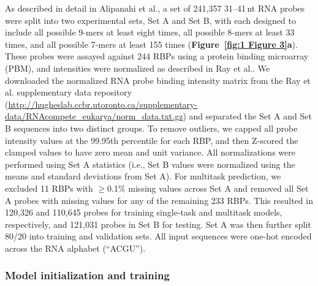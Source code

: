 As described in detail in Alipanahi et al.\cite{Alipanahi2015-ef}, a set of 241{,}357 31--41\,nt RNA probes were split into two experimental sets, Set A and Set B, with each designed to include all possible 9-mers at least eight times, all possible 8-mers at least 33 times, and all possible 7-mers at least 155 times (\textbf{Figure~\ref{fig:1 Figure 3}\textbf{a}}). These probes were assayed against 244 RBPs using a protein binding microarray (PBM)\cite{Berger2009-la}, and intensities were normalized as described in Ray et al.\cite{Ray2013-yd}. We downloaded the normalized RNA probe binding intensity matrix from the Ray et al. supplementary data repository (\url{http://hugheslab.ccbr.utoronto.ca/supplementary-data/RNAcompete_eukarya/norm_data.txt.gz}) and separated the Set A and Set B sequences into two distinct groups. To remove outliers, we capped all probe intensity values at the 99.95th percentile for each RBP, and then Z-scored the clamped values to have zero mean and unit variance. All normalizations were performed using Set A statistics (i.e., Set B values were normalized using the means and standard deviations from Set A). For multitask prediction, we excluded 11 RBPs with $\geq$0.1\% missing values across Set A and removed all Set A probes with missing values for any of the remaining 233 RBPs. This resulted in 120{,}326 and 110{,}645 probes for training single-task and multitask models, respectively, and 121{,}031 probes in Set B for testing. Set A was then further split 80/20 into training and validation sets. All input sequences were one-hot encoded across the RNA alphabet (“ACGU”).

\subsubsection{Model initialization and training}

